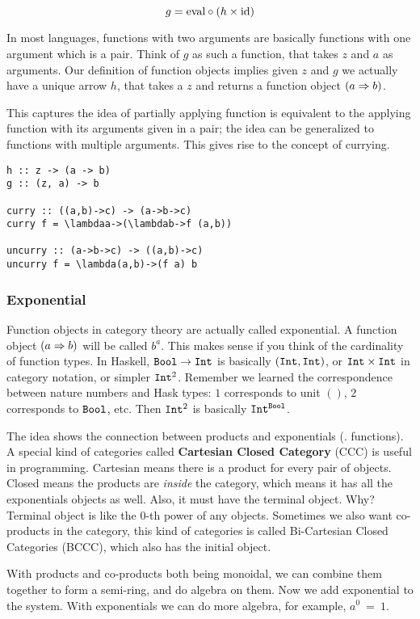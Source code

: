 \[
  g = \textrm{eval} \circ (h \times \mathrm{id})
\]

In most languages, functions with two arguments are basically functions with one
argument which is a pair. Think of $g$ as such a function, that takes $z$ and
$a$ as arguments. Our definition of function objects implies given $z$ and $g$
we actually have a unique arrow $h$, that takes a $z$ and returns a function
object $(a\Rightarrow{}b)$.

This captures the idea of partially applying function is
equivalent to the applying function with its arguments given in a pair; the idea
can be generalized to functions with multiple arguments. This gives rise to the
concept of currying.

\begin{lstlisting}
h :: z -> (a -> b)
g :: (z, a) -> b

curry :: ((a,b)->c) -> (a->b->c)
curry f = \lambdaa->(\lambdab->f (a,b))

uncurry :: (a->b->c) -> ((a,b)->c)
uncurry f = \lambda(a,b)->(f a) b
\end{lstlisting}


\subsubsection{Exponential}

Function objects in category theory are actually called exponential. A function
object $(a\Rightarrow{}b)$ will be called $b^a$. This makes sense if you think of the
cardinality of function types. In Haskell, $\texttt{Bool} \to \texttt{Int}$ is basically $(\texttt{Int},
\texttt{Int})$, or $\texttt{Int} \times \texttt{Int}$ in category notation, or simpler $\texttt{Int}^2$.
Remember we learned the correspondence between nature numbers and Hask types:
$1$ corresponds to unit $()$, $2$ corresponds to $\texttt{Bool}$, etc. Then $\texttt{Int}^2$ is
basically $\texttt{Int}^{\texttt{Bool}}$.

The idea shows the connection between products and exponentials (\ie.
functions). A special kind of categories called \textbf{Cartesian Closed
  Category} (CCC) is useful in programming. Cartesian means there is a product
for every pair of objects. Closed means the products are \emph{inside} the
category, which means it has all the exponentials objects as well. Also, it must
have the terminal object. Why? Terminal object is like the $0$-th power of any
objects. Sometimes we also want co-products in the category, this kind of
categories is called Bi-Cartesian Closed Categories (BCCC), which also has the
initial object.

With products and co-products both being monoidal, we can combine them together
to form a semi-ring, and do algebra on them. Now we add exponential to the
system. With exponentials we can do more algebra, for example, $a^0~=~1$.


